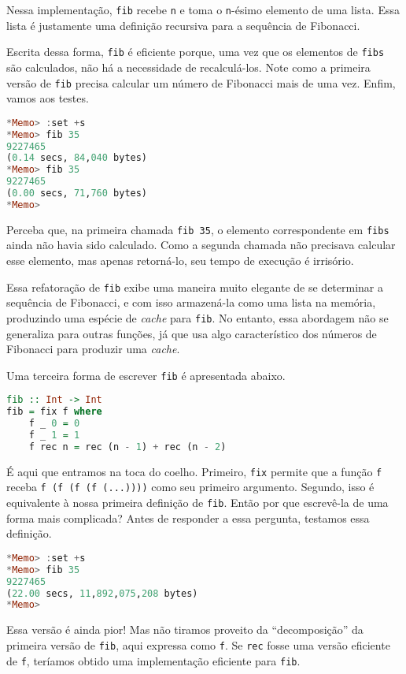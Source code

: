 \documentclass[a4paper]{article}
\begin{document}
Nessa implementação, \texttt{fib} recebe \texttt{n} e toma o \texttt{n}-ésimo elemento de uma lista.
Essa lista é justamente uma definição recursiva para a sequência de Fibonacci.

Escrita dessa forma, \texttt{fib} é eficiente porque, uma vez que os elementos de \texttt{fibs} são calculados, não há a necessidade de recalculá-los.
Note como a primeira versão de \texttt{fib} precisa calcular um número de Fibonacci mais de uma vez.
Enfim, vamos aos testes.

\begin{lstlisting}[language=haskell, frame=single]
*Memo> :set +s
*Memo> fib 35
9227465
(0.14 secs, 84,040 bytes)
*Memo> fib 35
9227465
(0.00 secs, 71,760 bytes)
*Memo>
\end{lstlisting}

Perceba que, na primeira chamada \texttt{fib 35}, o elemento correspondente em \texttt{fibs} ainda não havia sido calculado.
Como a segunda chamada não precisava calcular esse elemento, mas apenas retorná-lo, seu tempo de execução é irrisório.

Essa refatoração de \texttt{fib} exibe uma maneira muito elegante de se determinar a sequência de Fibonacci, e com isso armazená-la como uma lista na memória, produzindo uma espécie de \emph{cache} para \texttt{fib}.
No entanto, essa abordagem não se generaliza para outras funções, já que usa algo característico dos números de Fibonacci para produzir uma \emph{cache}.

Uma terceira forma de escrever \texttt{fib} é apresentada abaixo.

\begin{lstlisting}[language=haskell, frame=single]
fib :: Int -> Int
fib = fix f where
	f _ 0 = 0
	f _ 1 = 1
	f rec n = rec (n - 1) + rec (n - 2)
\end{lstlisting}

É aqui que entramos na toca do coelho.
Primeiro, \texttt{fix} permite que a função \texttt{f} receba \mbox{\texttt{f (f (f (f (...))))}} como seu primeiro argumento.
Segundo, isso é equivalente à nossa primeira definição de \texttt{fib}.
Então por que escrevê-la de uma forma mais complicada?
Antes de responder a essa pergunta, testamos essa definição.

\begin{lstlisting}[language=haskell, frame=single]
*Memo> :set +s
*Memo> fib 35
9227465
(22.00 secs, 11,892,075,208 bytes)
*Memo>
\end{lstlisting}

Essa versão é ainda pior!
Mas não tiramos proveito da ``decomposição'' da primeira versão de \texttt{fib}, aqui expressa como \texttt{f}.
Se \texttt{rec} fosse uma versão eficiente de \texttt{f}, teríamos obtido uma implementação eficiente para \texttt{fib}.
\end{document}
